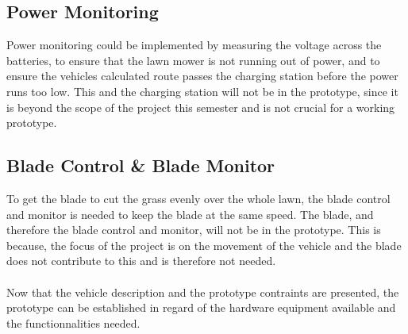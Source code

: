 \subsection{Power Monitoring}
Power monitoring could be implemented by measuring the voltage across the batteries, to ensure that the lawn mower is not running out of power, and to ensure the vehicles calculated route passes the charging station before the power runs too low.
This and the charging station will not be in the prototype, since it is beyond the scope of the project this semester and is not crucial for a working prototype.

\subsection{Blade Control \& Blade Monitor}
To get the blade to cut the grass evenly over the whole lawn, the blade control and monitor is needed to keep the blade at the same speed.
The blade, and therefore the blade control and monitor, will not be in the prototype. This is because, the focus of the project is on the movement of the vehicle and the blade does not contribute to this and is therefore not needed.\\\\




Now that the vehicle description and the prototype contraints are presented, the prototype can be established in regard of the hardware equipment available and the functionnalities needed.
